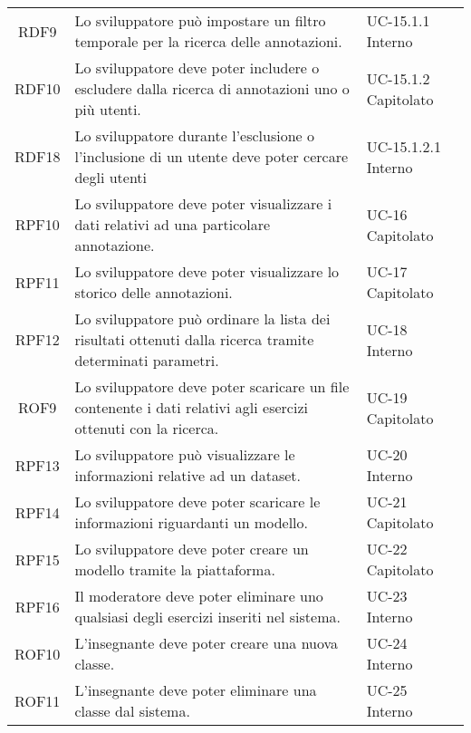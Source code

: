 \begin{tabularx}{\textwidth}{| c | p{10cm} | X |}
		RDF9 & Lo sviluppatore può impostare un filtro temporale per la ricerca delle annotazioni. & UC-15.1.1 \newline Interno\\
		RDF10 & Lo sviluppatore deve poter includere o escludere dalla ricerca di annotazioni uno o più utenti. & UC-15.1.2 \newline Capitolato\\
		RDF18 & Lo sviluppatore durante l'esclusione o l'inclusione di un utente deve poter cercare degli utenti & UC-15.1.2.1 \newline Interno\\		
		RPF10 & Lo sviluppatore deve poter visualizzare i dati relativi ad una particolare annotazione. & UC-16 \newline Capitolato\\
		RPF11 & Lo sviluppatore deve poter visualizzare lo storico delle annotazioni. & UC-17 \newline Capitolato\\
		RPF12 & Lo sviluppatore può ordinare la lista dei risultati ottenuti dalla ricerca tramite determinati parametri. & UC-18 \newline Interno\\	
		ROF9 & Lo sviluppatore deve poter scaricare un file contenente i dati relativi agli esercizi ottenuti con la ricerca. & UC-19 \newline Capitolato\\
		RPF13 & Lo sviluppatore può visualizzare le informazioni relative ad un dataset. & UC-20 \newline Interno\\
		RPF14 & Lo sviluppatore deve poter scaricare le informazioni riguardanti un modello. & UC-21 \newline Capitolato\\
		RPF15 & Lo sviluppatore deve poter creare un modello tramite la piattaforma. & UC-22 \newline Capitolato\\ 
		RPF16 & Il moderatore deve poter eliminare uno qualsiasi degli esercizi inseriti nel sistema. & UC-23 \newline Interno\\
		ROF10 & L'insegnante deve poter creare una nuova classe. & UC-24 \newline Interno\\
		ROF11 & L'insegnante deve poter eliminare una classe dal sistema. & UC-25 \newline Interno\\

\end{tabularx}
